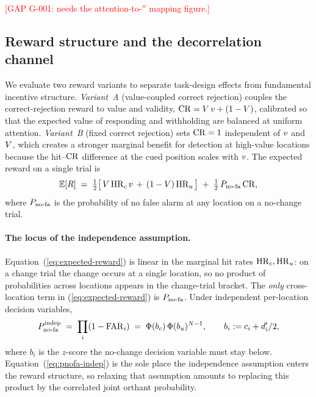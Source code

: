 \textcolor{red}{[GAP G-001: needs the attention-to-$\dprime$ mapping
figure.]}

\subsection{Reward structure and the decorrelation channel}
\label{sec:model-reward}

We evaluate two reward variants to separate task-design effects from
fundamental incentive structure. \emph{Variant~A} (value-coupled
correct rejection) couples the correct-rejection reward to value and
validity, $\mathrm{CR} = V\,v + (1 - V)$, calibrated so that the
expected value of responding and withholding are balanced at uniform
attention. \emph{Variant~B} (fixed correct rejection) sets $\mathrm{CR} = 1$
independent of $v$ and $V$, which creates a stronger marginal
benefit for detection at high-value locations because the hit--$\mathrm{CR}$
difference at the cued position scales with $v$. The expected reward
on a single trial is
\begin{equation}
  \mathbb{E}[R]
  \;=\;
  \tfrac{1}{2}\big[\,V\,\mathrm{HR}_c\,v
                  \,+\,(1-V)\,\mathrm{HR}_u\,\big]
  \;+\;
  \tfrac{1}{2}\,P_{\mathrm{no\text{-}fa}}\,\mathrm{CR},
  \label{eq:expected-reward}
\end{equation}
where $P_{\mathrm{no\text{-}fa}}$ is the probability of no false alarm at any location on a
no-change trial.

\paragraph{The locus of the independence assumption.}
Equation~(\ref{eq:expected-reward}) is linear in the marginal hit rates
$\mathrm{HR}_c, \mathrm{HR}_u$: on a change trial the change occurs at a single location,
so no product of probabilities across locations appears in the
change-trial bracket. The \emph{only} cross-location term in
(\ref{eq:expected-reward}) is $P_{\mathrm{no\text{-}fa}}$. Under independent per-location
decision variables,
\begin{equation}
  P_{\mathrm{no\text{-}fa}}^{\text{indep}}
  \;=\;
  \prod_{i} (1 - \mathrm{FAR}_i)
  \;=\;
  \Phi(b_c)\,\Phi(b_u)^{N - 1},
  \qquad
  b_i := c_i + d'_i/2,
  \label{eq:pnofa-indep}
\end{equation}
where $b_i$ is the $z$-score the no-change decision variable must stay
below. Equation~(\ref{eq:pnofa-indep}) is the sole place the
independence assumption enters the reward structure, so relaxing that
assumption amounts to replacing this product by the correlated joint
orthant probability.

